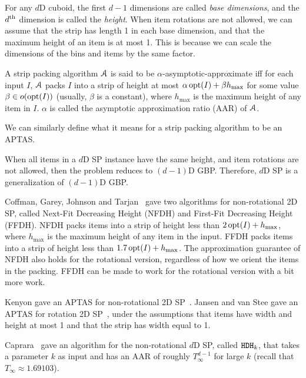 For any $d$D cuboid, the first $d-1$ dimensions are called \emph{base dimensions},
and the $d^{\textrm{th}}$ dimension is called the \emph{height}.
When item rotations are not allowed, we can assume \wLoG{} that
the strip has length 1 in each base dimension, and that the
maximum height of an item is at most 1.
This is because we can scale the dimensions of the bins and items by the same factor.

\begin{definition}
A strip packing algorithm $\mathcal{A}$ is said to be
$\alpha$-asymptotic-approximate iff for each input $I$,
$\mathcal{A}$ packs $I$ into a strip of height at most
$\alpha\operatorname{opt}(I) + \beta h_{\max}$
for some value $\beta \in o(\operatorname{opt}(I))$ (usually, $\beta$ is a constant),
where $h_{\max}$ is the maximum height of any item in $I$.
$\alpha$ is called the asymptotic approximation ratio (AAR) of $\mathcal{A}$.
\end{definition}
We can similarly define what it means for a strip packing algorithm to be an APTAS.

When all items in a $d$D SP instance have the same height,
and item rotations are not allowed, then the problem reduces to $(d-1)$D GBP.
Therefore, $d$D SP is a generalization of $(d-1)$D GBP.

Coffman, Garey, Johnson and Tarjan~\cite{coffman1980performance}
gave two algorithms for non-rotational 2D SP,
called Next-Fit Decreasing Height (NFDH) and First-Fit Decreasing Height (FFDH).
NFDH packs items into a strip of height less than $2\operatorname{opt}(I) + h_{\max}$,
where $h_{\max}$ is the maximum height of any item in the input.
FFDH packs items into a strip of height less than $1.7\operatorname{opt}(I) + h_{\max}$.
The approximation guarantee of NFDH also holds for the rotational version,
regardless of how we orient the items in the packing.
FFDH can be made to work for the rotational version with a bit more work.

Kenyon gave an APTAS for non-rotational 2D SP~\cite{kenyon1996strip}.
Jansen and van Stee gave an APTAS for rotation 2D SP~\cite{jansen2005strip},
under the assumptions that items have width and height at most 1
and that the strip has width equal to 1.

Caprara~\cite{caprara2008} gave an algorithm for the
non-rotational $d$D SP, called $\operatorname{\mathtt{HDH}}_{k}$,
that takes a parameter $k$ as input and has an AAR of roughly
$T_{\infty}^{d-1}$ for large $k$
(recall that $T_{\infty} \approx 1.69103$).

